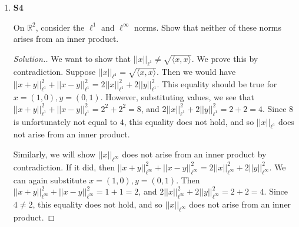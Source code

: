 \documentclass{article}
\newcommand{\U}{\mathcal{U}}
\newcommand{\R}{\mathbb{R}}
\newcommand{\C}{\mathbb{C}}
\newcommand{\sk}{\smallskip}
\begin{document}
\begin{enumerate}
\begin{proof}[Solution.]
    \sk 

    Now suppose that there exists an $N$ and an $M$ such that $\forall n \geq N$ and $m \geq M$, $x_{nm} = 0$ and for $1 \leq m \leq M - 1$, $\lim x_{nm} = 0$. We want to show that $(x_n) \longrightarrow 0$ in $X_B$, that is, if $\U$ is a neighborhood of $0$, then there exists an $N$ such that for all $n \geq N$, $x_n \in \U$. If $\U$ is open in $X_B$, then there is a basis element $B \subset \U$ of the form $B = B_\C(x_1, \epsilon_1) \times B_\C(x_2, \epsilon_2) \times \dots$ where $0 \in B$. 

    \sk

    For any such $B$, let $N$ be the $N$ such that $\forall n \geq N$ and $m \geq M$, $x_{nm} = 0$. There are now two cases. If $m \geq M$, then $x_{nm} = 0$, and so $x_{nm} \in B_m$. Otherwise, if $1 \leq m \leq M - 1$, then we are given $\lim x_{nm} = 0$. This means that we can find an $N_m$ such that $|x_{nm}| < \epsilon$ for $n \geq N_m$. Thus, for $n \geq N_m$, $x_{nm} \in B_m$. Let $\epsilon > 0$ and let $N'' = \max(N, N_1, N_2, \dots)$, which is valid because there are finitely many integers $m \in [1, M-1]$. For all $n \geq N''$, we have that $|x_{nm}| < \epsilon$, and so $(x_n) \longrightarrow 0$. 
        
    \end{proof}

    \item \textbf{S4}
    
    On $\R^2$, consider the $\ell^1$ and $\ell^\infty$ norms. Show that neither of these norms arises from an inner product. 

    \begin{proof}[Solution.]
        We want to show that $||x||_{\ell^1} \neq \sqrt{\langle x, x\rangle}$. We prove this by contradiction. Suppose $||x||_{\ell^1} = \sqrt{\langle x, x\rangle}$. Then we would have $||x+y||^2_{\ell^1} + ||x-y||^2_{\ell^1} = 2||x||_{\ell^1}^2 + 2||y||_{\ell^1}^2$. This equality should be true for $x = (1, 0), y = (0, 1)$. However, substituting values, we see that $||x+y||^2_{\ell^1} + ||x-y||^2_{\ell^1} = 2^2 + 2^2 = 8$, and $2||x||_{\ell^1}^2 + 2||y||_{\ell^1}^2 = 2 + 2 = 4$. Since $8$ is unfortunately not equal to $4$, this equality does not hold, and so $||x||_{\ell^1}$ does not arise from an inner product. 

        \sk

        Similarly, we will show $||x||_{\ell^\infty}$ does not arise from an inner product by contradiction. If it did, then $||x+y||^2_{\ell^\infty} + ||x-y||^2_{\ell^\infty} = 2||x||_{\ell^\infty}^2 + 2||y||_{\ell^\infty}^2$. We can again substitute $x = (1, 0), y = (0, 1)$. Then $||x+y||^2_{\ell^\infty} + ||x-y||^2_{\ell^\infty} = 1 + 1 = 2$, and $2||x||_{\ell^\infty}^2 + 2||y||_{\ell^\infty}^2 = 2 + 2 = 4$. Since $4 \neq 2$, this equality does not hold, and so $||x||_{\ell^\infty}$ does not arise from an inner product.
    \end{proof}


\end{enumerate}
\end{document}
